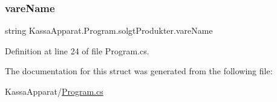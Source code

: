 \subsubsection{\texorpdfstring{vare\+Name}{vareName}}
{\footnotesize\ttfamily string Kassa\+Apparat.\+Program.\+solgt\+Produkter.\+vare\+Name}



Definition at line 24 of file Program.\+cs.



The documentation for this struct was generated from the following file\+:\begin{DoxyCompactItemize}
\item 
Kassa\+Apparat/\mbox{\hyperlink{_program_8cs}{Program.\+cs}}\end{DoxyCompactItemize}
